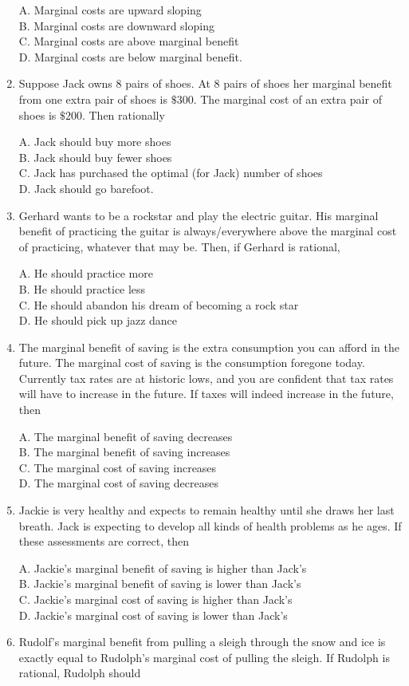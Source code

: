 \documentclass[
]{book}
\begin{document}
\begin{enumerate}
  A. Marginal costs are upward sloping\\
  B. Marginal costs are downward sloping\\
  C. Marginal costs are above marginal benefit\\
  D. Marginal costs are below marginal benefit.
\item
  Suppose Jack owns 8 pairs of shoes. At 8 pairs of shoes her marginal benefit from one extra pair of shoes is \(\$300\). The marginal cost of an extra pair of shoes is \(\$200\). Then rationally

  A. Jack should buy more shoes\\
  B. Jack should buy fewer shoes\\
  C. Jack has purchased the optimal (for Jack) number of shoes\\
  D. Jack should go barefoot.
\item
  Gerhard wants to be a rockstar and play the electric guitar. His marginal benefit of practicing the guitar is always/everywhere above the marginal cost of practicing, whatever that may be. Then, if Gerhard is rational,

  A. He should practice more\\
  B. He should practice less\\
  C. He should abandon his dream of becoming a rock star\\
  D. He should pick up jazz dance
\item
  The marginal benefit of saving is the extra consumption you can afford in the future. The marginal cost of saving is the consumption foregone today. Currently tax rates are at historic lows, and you are confident that tax rates will have to increase in the future. If taxes will indeed increase in the future, then

  A. The marginal benefit of saving decreases\\
  B. The marginal benefit of saving increases\\
  C. The marginal cost of saving increases\\
  D. The marginal cost of saving decreases
\item
  Jackie is very healthy and expects to remain healthy until she draws her last breath. Jack is expecting to develop all kinds of health problems as he ages. If these assessments are correct, then

  A. Jackie's marginal benefit of saving is higher than Jack's\\
  B. Jackie's marginal benefit of saving is lower than Jack's\\
  C. Jackie's marginal cost of saving is higher than Jack's\\
  D. Jackie's marginal cost of saving is lower than Jack's
\item
  Rudolf's marginal benefit from pulling a sleigh through the snow and ice is exactly equal to Rudolph's marginal cost of pulling the sleigh. If Rudolph is rational, Rudolph should


\end{enumerate}
\end{document}
